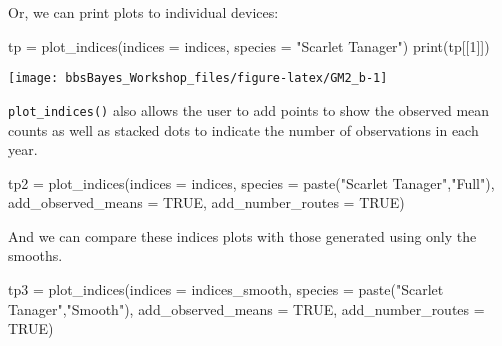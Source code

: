 \documentclass[
]{book}
\newenvironment{Shaded}{\begin{snugshade}}{\end{snugshade}}
\newcommand{\AttributeTok}[1]{\textcolor[rgb]{0.77,0.63,0.00}{#1}}
\newcommand{\ConstantTok}[1]{\textcolor[rgb]{0.00,0.00,0.00}{#1}}
\newcommand{\DecValTok}[1]{\textcolor[rgb]{0.00,0.00,0.81}{#1}}
\newcommand{\FunctionTok}[1]{\textcolor[rgb]{0.00,0.00,0.00}{#1}}
\newcommand{\NormalTok}[1]{#1}
\newcommand{\OtherTok}[1]{\textcolor[rgb]{0.56,0.35,0.01}{#1}}
\newcommand{\StringTok}[1]{\textcolor[rgb]{0.31,0.60,0.02}{#1}}
\begin{document}
Or, we can print plots to individual devices:

\begin{Shaded}
\begin{Highlighting}[]
\NormalTok{tp }\OtherTok{=} \FunctionTok{plot\_indices}\NormalTok{(}\AttributeTok{indices =}\NormalTok{ indices,}
                         \AttributeTok{species =} \StringTok{"Scarlet Tanager"}\NormalTok{)}
\FunctionTok{print}\NormalTok{(tp[[}\DecValTok{1}\NormalTok{]])}
\end{Highlighting}
\end{Shaded}

\begin{center}\texttt{[image: bbsBayes\_Workshop\_files/figure-latex/GM2\_b-1]} \end{center}

\texttt{plot\_indices()} also allows the user to add points to show the observed mean counts as well as stacked dots to indicate the number of observations in each year.

\begin{Shaded}
\begin{Highlighting}[]
\NormalTok{tp2 }\OtherTok{=} \FunctionTok{plot\_indices}\NormalTok{(}\AttributeTok{indices =}\NormalTok{ indices,}
                         \AttributeTok{species =} \FunctionTok{paste}\NormalTok{(}\StringTok{"Scarlet Tanager"}\NormalTok{,}\StringTok{"Full"}\NormalTok{),}
                  \AttributeTok{add\_observed\_means =} \ConstantTok{TRUE}\NormalTok{,}
                  \AttributeTok{add\_number\_routes =} \ConstantTok{TRUE}\NormalTok{)}
\end{Highlighting}
\end{Shaded}

And we can compare these indices plots with those generated using only the smooths.

\begin{Shaded}
\begin{Highlighting}[]
\NormalTok{tp3 }\OtherTok{=} \FunctionTok{plot\_indices}\NormalTok{(}\AttributeTok{indices =}\NormalTok{ indices\_smooth,}
                         \AttributeTok{species =} \FunctionTok{paste}\NormalTok{(}\StringTok{"Scarlet Tanager"}\NormalTok{,}\StringTok{"Smooth"}\NormalTok{),}
                  \AttributeTok{add\_observed\_means =} \ConstantTok{TRUE}\NormalTok{,}
                  \AttributeTok{add\_number\_routes =} \ConstantTok{TRUE}\NormalTok{)}
\end{Highlighting}
\end{Shaded}
\end{document}
